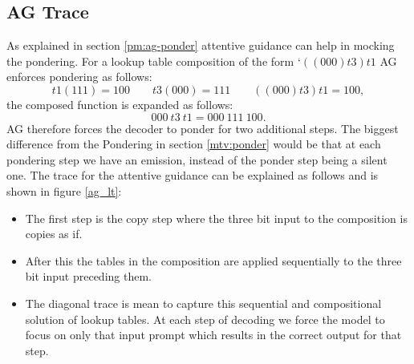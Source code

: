 \subsection{AG Trace}
As explained in section \ref{pm:ag-ponder} attentive guidance can help in mocking the pondering. For a lookup table composition of the form \lq $((000)t3)t1$ AG enforces pondering as follows:
\begin{equation}
t1(111) = 100 \qquad t3(000) = 111 \qquad ((000)t3)t1 = 100,
\end{equation}
the composed function is expanded as follows:
\begin{equation}
000\ t3\ t1 = 000\ 111\ 100.
\end{equation}
AG therefore forces the decoder to ponder for two additional steps. The biggest difference from the Pondering in section \ref{mtv:ponder} would be that at each pondering step we have an emission, instead of the ponder step being a silent one. The trace for the attentive guidance can be explained as follows and is shown in figure \ref{ag_lt}:
\begin{itemize}
	\item The first step is the copy step where the three bit input to the composition is copies as if.
	\item After this the tables in the composition are applied sequentially to the three bit input preceding them.
	\item The diagonal trace is mean to capture this sequential and compositional solution of lookup tables. At each step of decoding we force the model to focus on only that input prompt which results in the correct output for that step.
\end{itemize}


